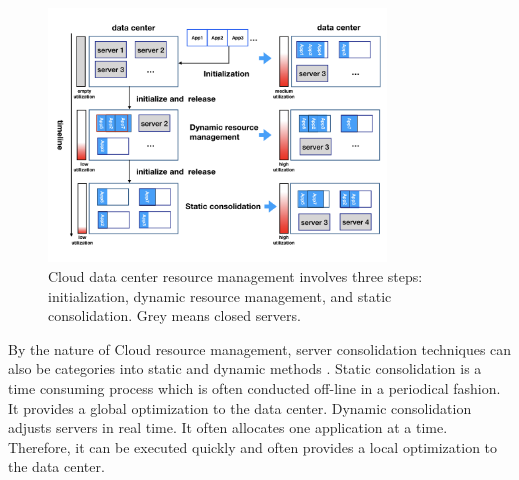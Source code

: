 \begin{figure}
	\centering
	\includegraphics[width=0.8\textwidth]{pics/resource_management.png}
	\caption{Cloud data center resource management involves three steps: initialization, dynamic resource management, and static consolidation. Grey means closed servers.}
	\label{fig:management}
\end{figure} 


By the nature of Cloud resource management, server consolidation techniques can also be categories into static and dynamic methods \cite{Xiao:2015ik, Verma:2009wi}. Static consolidation is a time consuming process which is often conducted off-line in a periodical fashion. It provides a global optimization to the data center. Dynamic consolidation adjusts servers in real time. It often allocates one application at a time. Therefore, it can be executed quickly and often provides a local optimization to the data center.

